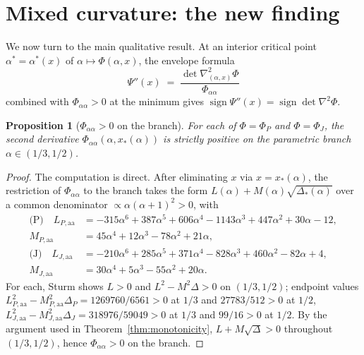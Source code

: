 \documentclass[11pt]{amsart}
\newtheorem{proposition}[theorem]{Proposition}
\theoremstyle{definition}
\begin{document}
\section{Mixed curvature: the new finding}
\label{sec:curvature}

We now turn to the main qualitative result.  At an interior critical point
$\alpha^*=\alpha^*(x)$ of $\alpha\mapsto\Phi(\alpha,x)$, the envelope formula
\[
   \Psi''(x) \;=\; \frac{\det \nabla^2_{(\alpha,x)}\Phi}{\Phi_{\alpha\alpha}}
\]
combined with $\Phi_{\alpha\alpha} > 0$ at the minimum gives
$\operatorname{sign} \Psi''(x) = \operatorname{sign} \det\nabla^2\Phi$.

\begin{proposition}[$\Phi_{\alpha\alpha} > 0$ on the branch]
\label{prop:Phiaa-positive}
For each of $\Phi=\Phi_P$ and $\Phi=\Phi_J$, the second derivative
$\Phi_{\alpha\alpha}(\alpha,x_*(\alpha))$ is strictly positive on the parametric
branch $\alpha\in(1/3,1/2)$.
\end{proposition}

\begin{proof}
The computation is direct.  After eliminating $x$ via $x=x_*(\alpha)$, the
restriction of $\Phi_{\alpha\alpha}$ to the branch takes the form
$L(\alpha) + M(\alpha)\sqrt{\Delta_*(\alpha)}$ over a common denominator
$\propto \alpha(\alpha+1)^2 > 0$, with
\begin{align*}
\text{(P)}\quad L_{P,\mathrm{aa}} &= -315\alpha^6+387\alpha^5+606\alpha^4-1143\alpha^3+447\alpha^2+30\alpha-12,\\
            M_{P,\mathrm{aa}} &= 45\alpha^4+12\alpha^3-78\alpha^2+21\alpha,\\
\text{(J)}\quad L_{J,\mathrm{aa}} &= -210\alpha^6+285\alpha^5+371\alpha^4-828\alpha^3+460\alpha^2-82\alpha+4,\\
            M_{J,\mathrm{aa}} &= 30\alpha^4+5\alpha^3-55\alpha^2+20\alpha.
\end{align*}
For each, Sturm shows $L > 0$ and $L^2 - M^2\Delta > 0$ on $(1/3,1/2)$;
endpoint values
$L_{P,\mathrm{aa}}^2 - M_{P,\mathrm{aa}}^2\Delta_P = 1269760/6561 > 0$ at $1/3$
and $27783/512 > 0$ at $1/2$,
$L_{J,\mathrm{aa}}^2 - M_{J,\mathrm{aa}}^2\Delta_J = 318976/59049 > 0$ at $1/3$
and $99/16 > 0$ at $1/2$.  By the
argument used in Theorem~\ref{thm:monotonicity},
$L + M\sqrt{\Delta} > 0$ throughout $(1/3,1/2)$, hence
$\Phi_{\alpha\alpha} > 0$ on the branch.
\end{proof}
\end{document}
